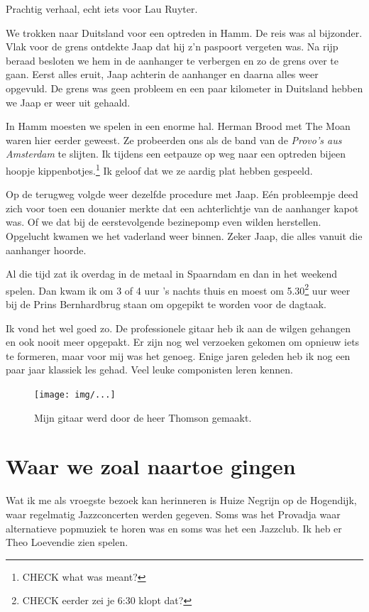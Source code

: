 \documentclass[12pt,twoside]{memoir}
\begin{document}
Prachtig verhaal, echt iets voor Lau Ruyter.

We trokken naar Duitsland voor een optreden in Hamm. De reis was al bijzonder. Vlak voor de grens ontdekte Jaap dat hij z’n paspoort vergeten was. Na rijp beraad besloten we hem in de aanhanger te verbergen en zo de grens over te gaan. Eerst alles eruit, Jaap achterin de aanhanger en daarna alles weer opgevuld. De grens was geen probleem en een paar kilometer in Duitsland hebben we Jaap er weer uit gehaald. 

In Hamm moesten we spelen in een enorme hal. Herman Brood met The Moan waren hier eerder geweest. Ze probeerden ons als de band van de \emph{Provo’s aus Amsterdam} te slijten. Ik tijdens een eetpauze op weg naar een optreden bijeen hoopje kippenbotjes.\footnote{CHECK what was meant?} Ik geloof dat we ze aardig plat hebben gespeeld.

Op de terugweg volgde weer dezelfde procedure met Jaap. Eén probleempje deed zich voor toen een douanier merkte dat een achterlichtje van de aanhanger kapot was. Of we dat bij de eerstevolgende bezinepomp even wilden herstellen. Opgelucht kwamen we het vaderland weer binnen. Zeker Jaap, die alles vanuit die aanhanger hoorde.

Al die tijd zat ik overdag in de metaal in Spaarndam en dan in het weekend spelen. Dan kwam ik om 3 of 4 uur ’s nachts thuis en moest om 5.30\footnote{CHECK eerder zei je 6:30 klopt dat?} uur weer bij de Prins Bernhardbrug staan om opgepikt te worden voor de dagtaak. 

Ik vond het wel goed zo. De professionele gitaar heb ik aan de wilgen gehangen en ook nooit meer opgepakt. Er zijn nog wel verzoeken gekomen om opnieuw iets te formeren, maar voor mij was het genoeg. Enige jaren geleden heb ik nog een paar jaar klassiek les gehad. Veel leuke componisten leren kennen.

\begin{figure}[t]
\texttt{[image: img/...]}
\caption{Mijn gitaar werd door de heer Thomson gemaakt.}
\end{figure} 

\chapter{Waar we zoal naartoe gingen} %
\label{cha:naartoegaan}

Wat ik me als vroegste bezoek kan herinneren is Huize Negrijn op de Hogendijk, waar regelmatig Jazzconcerten werden gegeven. Soms was het Provadja waar alternatieve popmuziek te horen was en soms was het een Jazzclub. Ik heb er Theo Loevendie zien spelen.
\end{document}
